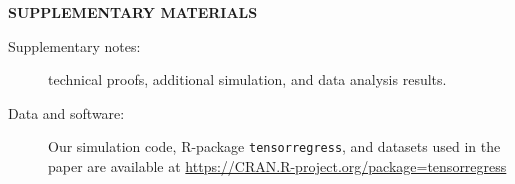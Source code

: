 \documentclass[12pt]{article}
\theoremstyle{definition}
\theoremstyle{definition}
\begin{document}
\bigskip
\begin{center}
{\large \bf SUPPLEMENTARY MATERIALS}
\end{center}

\begin{description}
\item[Supplementary notes:]  technical proofs, additional simulation, and data analysis results.
\item[Data and software:] 
Our simulation code, R-package \texttt{tensorregress}, and datasets used in the paper are available at \url{https://CRAN.R-project.org/package=tensorregress}
\end{description}




\end{document}
